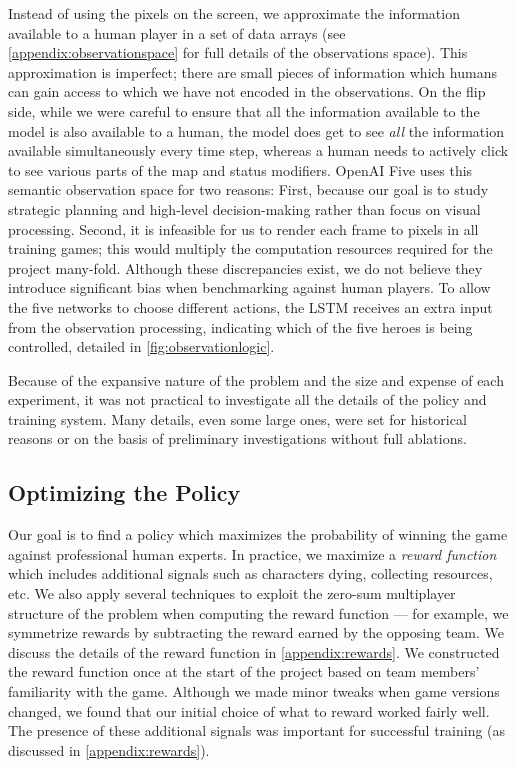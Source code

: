 \documentclass[11pt]{article}
\newcommand{\openaifive}{OpenAI Five\xspace}
\begin{document}
Instead of using the pixels on the screen, we approximate the information available to a human player in a set of data arrays (see \autoref{appendix:observationspace} for full details of the observations space). 
This approximation is imperfect; there are small pieces of information which humans can gain access to which we have not encoded in the observations. 
On the flip side, while we were careful to ensure that all the information available to the model is also available to a human, the model does get to see \emph{all} the information available simultaneously every time step, whereas a human needs to actively click to see various parts of the map and status modifiers. 
\openaifive uses this semantic observation space for two reasons: First, because our goal is to study strategic planning and high-level decision-making rather than focus on visual processing. 
Second, it is infeasible for us to render each frame to pixels in all training games; this would multiply the computation resources required for the project many-fold.
Although these discrepancies exist, we do not believe they introduce significant bias when benchmarking against human players.
To allow the five networks to choose different actions, the LSTM receives an extra input from the observation processing, indicating which of the five heroes is being controlled, detailed in \autoref{fig:observationlogic}.

Because of the expansive nature of the problem and the size and expense of each experiment, it was not practical to investigate all the details of the policy and training system.
Many details, even some large ones, were set for historical reasons or on the basis of preliminary investigations without full ablations.

\subsection{Optimizing the Policy}
Our goal is to find a policy which maximizes the probability of winning the game against professional human experts. 
In practice, we maximize a {\it reward function} which includes additional signals such as characters dying, collecting resources, etc. 
We also apply several techniques to exploit the zero-sum multiplayer structure of the problem when computing the reward function --- for example, we symmetrize rewards by subtracting the reward earned by the opposing team. 
We discuss the details of the reward function in \autoref{appendix:rewards}.
We constructed the reward function once at the start of the project based on team members' familiarity with the game. 
Although we made minor tweaks when game versions changed, we found that our initial choice of what to reward worked fairly well. 
The presence of these additional signals was important for successful training (as discussed in \autoref{appendix:rewards}).
\end{document}
